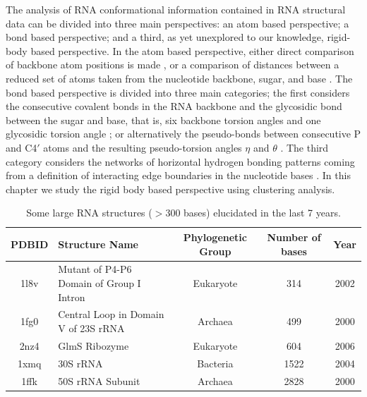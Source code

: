 \noindent The analysis of RNA conformational information contained in RNA
structural data can  be divided into three main  perspectives: an atom
based perspective; a bond  based perspective; and a third, as yet unexplored
to our knowledge,  rigid-body based perspective.   In the atom based
perspective,  either direct  comparison of  backbone atom  positions is
made \cite{reijmers2001}, or a comparison of distances between a reduced
set  of atoms  taken from  the  nucleotide backbone,  sugar, and  base
\cite{sykes2005}. The bond based  perspective is divided into three main
categories; the first considers the consecutive covalent bonds in the RNA
backbone and the glycosidic bond between the sugar and base,  that is, six
backbone   torsion   angles   and   one   glycosidic   torsion   angle
\cite{reijmers2001,  murray2003, hershkovitz2003, schneider2004,
hershkovitz2006};
or alternatively the pseudo-bonds between consecutive
P and  C4$\prime$ atoms  and the resulting  pseudo-torsion angles  $\eta$ and
$\theta$  \cite{olson1_1972,  duarte1998,  duarte2003, wadley2007}.  The
third category considers the  networks of horizontal hydrogen bonding
patterns coming  from a definition  of interacting edge  boundaries in
the nucleotide bases  \cite{westhof2000, leontis2002, leontis2006}. In
this chapter we study the rigid body based perspective using
clustering analysis.
\begin{table}[htbp]
\begin{center}
{\small
\begin{tabular}{c|p{5cm}|c|c|c}
\hline
\bf{PDBID} & \bf{Structure Name} & \bf{Phylogenetic Group} & \bf{Number of bases} & \bf{Year} \\ \hline
1l8v & Mutant of P4-P6 Domain of Group I Intron & Eukaryote & 314 & 2002 \\ \hline
1fg0 & Central Loop in Domain V of 23S rRNA & Archaea & 499 & 2000 \\ \hline
2nz4 & GlmS Ribozyme & Eukaryote & 604 & 2006 \\ \hline
1xmq & 30S rRNA & Bacteria & 1522 & 2004 \\ \hline
1ffk & 50S rRNA Subunit & Archaea & 2828 & 2000 \\ \hline
\end{tabular}
}
\caption{Some large RNA structures ($>$300 bases) elucidated in the last 7 years.}
\end{center}
\end{table}

